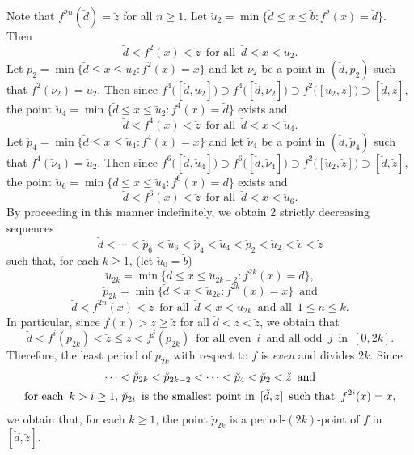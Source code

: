 \documentclass[12pt]{article}
\begin{document}
Note that $f^{2n}(\breve d) = \breve z$ for all $n \ge 1$.  Let $\breve u_2 = \min \big\{ \breve d \le x \le \breve b: f^2(x) = \breve d \big\}$.  Then 
$$
\breve d < f^2(x) < \breve z \,\,\, \text{for all} \,\,\, \breve d < x < \breve u_2.
$$  
\indent Let $\breve p_2 = \min \big\{ \breve d \le x \le \breve u_2: f^2(x) = x \big\}$ and let $\breve \nu_2$ be a point in $(\breve d, \breve p_2)$ such that $f^2(\breve \nu_2) = \breve u_2$.  Then since  $f^4\big([\breve d, \breve u_2]\big) \supset f^4\big([\breve d, \breve \nu_2]\big) \supset f^2\bigl([\breve u_2, \breve z]\bigr) \supset [\breve d, \breve z]$, the point $\breve u_4 = \min \big\{ \breve d \le x \le \breve u_2: f^4(x) = \breve d \big\}$ exists and  
$$
\breve d < f^4(x) < \breve z \,\,\, \text{for all} \,\,\, \breve d < x < \breve u_4.
$$ 
\indent Let $\breve p_4 = \min \big\{ \breve d \le x \le \breve u_4: f^4(x) = x \big\}$ and let $\breve \nu_4$ be a point in $(\breve d, \breve p_4)$ such that $f^4(\breve \nu_4) = \breve u_2$.  Then since  $f^6\bigl([\breve d, \breve u_4]\bigr) \supset f^6\bigl([\breve d, \breve \nu_4]\bigr) \supset f^2\big([\breve u_2, \breve z]\big) \supset [\breve d, \breve z]$, the point $\breve u_6 = \min \big\{ \breve d \le x \le \breve u_4: f^6(x) = \breve d \big\}$ exists and 
$$
\breve d < f^6(x) < \breve z \,\,\, \text{for all} \,\,\, \breve d < x < \breve u_6.
$$
\indent By proceeding in this manner indefinitely, we obtain 2 strictly decreasing sequences 
$$
\breve d < \cdots < \breve p_6 < \breve u_6 < \breve p_4 < \breve u_4 < \breve p_2 < \breve u_2 < \breve v < \breve z
$$ 
such that, for each $k \ge 1$, (let $\breve u_0 = \breve b$) 
$$
\breve u_{2k} = \min \big\{ \breve d \le x \le \breve u_{2k-2}: f^{2k}(x) = \breve d \big\},
$$
$$\breve p_{2k} = \min \big\{ \breve d \le x \le \breve u_{2k}: f^{2k}(x) = x \big\} \,\,\, \text{and}
$$ 
$$
\breve d < f^{2n}(x) < \breve z \,\,\, \text{for all} \,\,\, \breve d < x < \breve u_{2k} \,\,\, \text{and all} \,\,\, 1 \le n \le k.
$$
In particular, since $f(x) > z \ge \breve z$ for all $\breve d < z < \breve z$, we obtain that 
$$
\breve d < f^i(p_{2k}) < \breve z \le z < f^j(p_{2k}) \,\,\, \text{for all even} \,\,\, i \,\,\, \text{and all odd} \,\,\, j \,\,\, \text{in} \,\,\, [0, 2k].
$$
Therefore, the least period of $p_{2k}$ with respect to $f$ is {\it even} and divides $2k$.  Since 
\begin{multline*}
$$
\cdots < \breve p_{2k} < \breve p_{2k-2} < \cdots < \breve p_4 < \breve p_2 < \breve z \,\,\, \text{and} \\ 
\text{for each} \,\,\, k > i \ge 1, \, \breve p_{2i} \,\,\, \text{is the smallest point in} \,\,\, [\breve d, z] \,\,\, \text{such that} \,\,\, f^{2i}(x) = x, 
$$ 
\end{multline*}
we obtain that, for each $k \ge 1$, the point $\breve p_{2k}$ is a period-$(2k)$-point of $f$ in $[\breve d, \breve z]$. \vspace{.1in}
\end{document}
